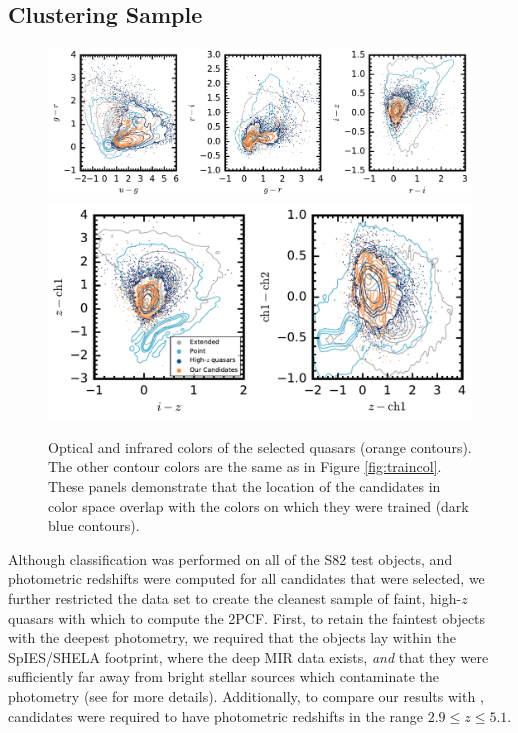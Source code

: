\documentclass[apj, numberedappendix]{emulateapj}
\begin{document}
 \subsection{Clustering Sample}\label{sec:clustering_sample}
 
 \begin{figure}[ht!]
  \centering
  \includegraphics[scale=0.7]{./New_Plots/opt_cand_colors.pdf}
  \includegraphics[scale=0.7]{./New_Plots/ir_cand_colors.pdf}
  \caption{\footnotesize{Optical and infrared colors of the selected quasars (orange contours). The other contour colors are the same as in Figure \ref{fig:traincol}. These panels demonstrate that the location of the candidates in color space overlap with the colors on which they were trained (dark blue contours).}}%
  \label{fig:candcol}
\end{figure}
 
Although classification was performed on all of the S82 test objects, and photometric redshifts were computed for all candidates that were selected, we further restricted the data set to create the cleanest sample of faint, high-$z$ quasars with which to compute the 2PCF. First, to retain the faintest objects with the deepest photometry, we required that the objects lay within the SpIES/SHELA footprint, where the deep MIR data exists, \emph{and} that they were sufficiently far away from bright stellar sources which contaminate the photometry (see \citealt{Timlin2016} for more details). Additionally, to compare our results with \citet{Shen2007}, candidates were required to have photometric redshifts in the range $2.9 \leq z \leq 5.1$. 
\end{document}
